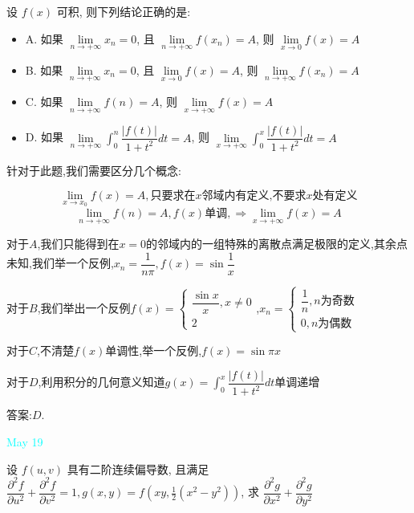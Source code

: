 \begin{example}[][Exam: 31.3.8]
	设 $f(x)$ 可积, 则下列结论正确的是: 
\begin{itemize} 
	\item A. 如果 $\lim\limits_{n\to +\infty}x_{n}=0$, 且 $\lim\limits_{n\to +\infty}f(x_{n})=A$, 则 $\lim\limits_{x\to 0}f(x)=A$
	\item B. 如果 $\lim\limits_{n\to +\infty}x_{n}=0$, 且 $\lim\limits_{x\to 0}f(x)=A$, 则 $\lim\limits_{n\to +\infty}f(x_{n})=A$
	\item C. 如果 $\lim\limits_{n\to +\infty}f(n)=A$, 则 $\lim\limits_{x\to +\infty}f(x)=A$
	\item D. 如果 $\lim\limits_{n\to +\infty}\int_{0}^{n}\dfrac{|f(t)|}{1+t^2}dt=A$, 则 $\lim\limits_{x\to +\infty}\int_{0}^{x}\dfrac{|f(t)|}{1+t^2}dt=A$
\end{itemize}
\end{example}

\begin{solution}
	
	针对于此题,我们需要区分几个概念: 
	
	$$\lim\limits_{x\to x_{0}}f(x)=A, \text{只要求在}x\text{邻域内有定义,不要求}x\text{处有定义}$$
	$$\lim\limits_{n\to+\infty}f(n)=A,f(x)\text{单调},\Rightarrow \lim\limits_{x\to+\infty}f(x)=A$$
	
	对于$A$,我们只能得到在$x=0$的邻域内的一组特殊的离散点满足极限的定义,其余点未知,我们举一个反例,$x_{n}=\dfrac{1}{n\pi},f(x)=\sin\dfrac{1}{x}$
	
	对于$B$,我们举出一个反例$f(x)=\left\lbrace 
	\begin{array}{l}
		\dfrac{\sin x}{x},x\neq 0\\
		2
	\end{array}
	\right. $,$x_{n}=\left\lbrace 
	\begin{array}{l}
		\dfrac{1}{n},n\text{为奇数}\\
		0,n\text{为偶数}
	\end{array}
	\right. $
	
	对于$C$,不清楚$f(x)$单调性,举一个反例,$f(x)=\sin \pi x$
	
	对于$D$,利用积分的几何意义知道$g(x)=\int_{0}^{x}\dfrac{|f(t)|}{1+t^2}dt$单调递增
	
	答案:$D$.
\end{solution}


\textcolor{cyan}{May 19}

\begin{example}[][Exam: 31.3.9]
	设 $f(u,v)$ 具有二阶连续偏导数, 且满足 $\dfrac{\partial^2 f}{\partial u^2}+\dfrac{\partial^2 f}{\partial v^2}=1, g(x,y)=f\left(xy,\frac{1}{2}(x^2-y^2)\right)$,
	求 $\dfrac{\partial^2 g}{\partial x^2}+\dfrac{\partial^2 g}{\partial y^2}$
\end{example}

